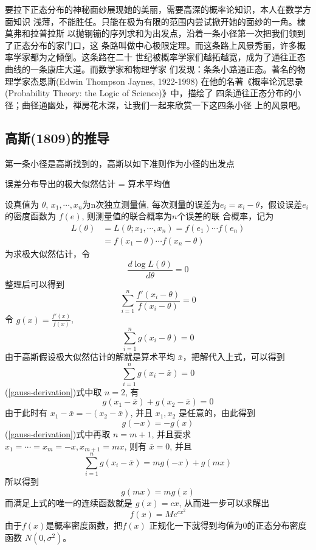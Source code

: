 要拉下正态分布的神秘面纱展现她的美丽，需要高深的概率论知识，本人在数学方面知识
浅薄，不能胜任。只能在极为有限的范围内尝试掀开她的面纱的一角。棣莫弗和拉普拉斯
以抛钢镚的序列求和为出发点，沿着一条小径第一次把我们领到了正态分布的家门口，这
条路叫做中心极限定理。而这条路上风景秀丽，许多概率学家都为之倾倒。这条路在二十
世纪被概率学家们越拓越宽，成为了通往正态曲线的一条康庄大道。而数学家和物理学家
们发现：条条小路通正态。著名的物理学家杰恩斯(Edwin Thompson Jaynes, 1922-1998)
在他的名著《概率论沉思录(Probability Theory: the Logic of Science)》中，描绘了
四条通往正态分布的小径；曲径通幽处，禅房花木深，让我们一起来欣赏一下这四条小径
上的风景吧。

\subsection{高斯(1809)的推导}

第一条小径是高斯找到的，高斯以如下准则作为小径的出发点
\begin{center}
误差分布导出的极大似然估计 = 算术平均值
\end{center}

设真值为 $\theta$, $x_1, \cdots, x_n$为n次独立测量值, 每次测量的误差为$ e_i =
x_i - \theta $，假设误差$e_i$的密度函数为 $f(e)$, 则测量值的联合概率为$n$个误差的联
合概率，记为
\begin{align*}
L(\theta) &= L(\theta;x_1,\cdots,x_n)=f(e_1)\cdots f(e_n)  \\
& = f(x_1-\theta)\cdots f(x_n-\theta)
\end{align*}
为求极大似然估计，令
$$\frac{d \log L(\theta)}{d \theta} = 0$$
整理后可以得到
$$ \sum_{i=1}^n \frac{f'(x_i-\theta)}{f(x_i-\theta)} = 0 $$
令 $g(x) = \frac{f'(x)}{f(x)}$,
$$ \sum_{i=1}^n g(x_i-\theta) = 0 $$
由于高斯假设极大似然估计的解就是算术平均 $\bar{x}$，把解代入上式，可以得到
\begin{equation}
\label{gauss-derivation}
\sum_{i=1}^n g(x_i-\bar{x}) = 0
\end{equation}
(\ref{gauss-derivation})式中取 $n=2$, 有
$$g(x_1-\bar{x}) + g(x_2-\bar{x}) = 0$$
由于此时有 $ x_1-\bar{x} = -(x_2-\bar{x})$, 并且 $x_1, x_2$ 是任意的，由此得到
$$ g(-x) = -g(x) $$
(\ref{gauss-derivation})式中再取 $n=m+1$, 并且要求 $x_1=\cdots=x_m=-x, x_{m+1} =
mx$, 则有 $\bar{x} = 0$, 并且
$$ \sum_{i=1}^n g(x_i-\bar{x}) = mg(-x) + g(mx) $$
所以得到
$$g(mx) = mg(x)$$
而满足上式的唯一的连续函数就是 $g(x)=cx$, 从而进一步可以求解出
$$f(x) = Me^{cx^2}$$
由于$f(x)$是概率密度函数，把$f(x)$ 正规化一下就得到均值为$0$的正态分布密度函数
$N(0,\sigma^2)$。


